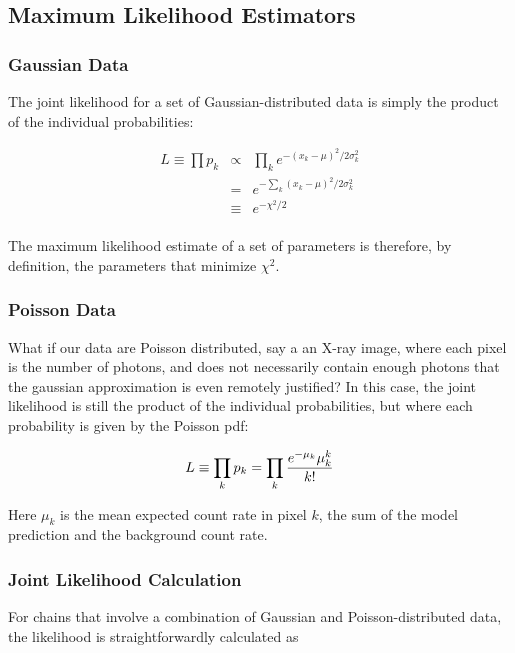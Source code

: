 \subsection{Maximum Likelihood Estimators}
\label{sec:maxmean}

\subsubsection{Gaussian Data}

The joint likelihood for a set of Gaussian-distributed data is simply
the product of the individual probabilities:

\begin{eqnarray}
L \equiv \prod{p_k} &\propto& \prod_k{e^{-(x_k - \mu)^2/2\sigma^2_k}} \\
                    &=& e^{-\sum_k{(x_k - \mu)^2/2\sigma^2_k}} \\
                    &\equiv& e^{-\chi^2/2} \\
\end{eqnarray}

The maximum likelihood estimate of a set of parameters is therefore,
by definition, the parameters that minimize $\chi^2$.

\subsubsection{Poisson Data}

What if our data are Poisson distributed, say a an X-ray image, where
each pixel is the number of photons, and does not necessarily contain
enough photons that the gaussian approximation is even remotely
justified?  In this case, the joint likelihood is still the product of
the individual probabilities, but where each probability is given by
the Poisson pdf:

\begin{equation}
L \equiv \prod_k{p_k} = \prod_k{{{e^{-\mu_k}\mu_k^k}\over{k!}}}
\end{equation}

Here $\mu_k$ is the mean expected count rate in pixel $k$, the sum of
the model prediction and the background count rate.

\subsubsection{Joint Likelihood Calculation}

For chains that involve a combination of Gaussian and
Poisson-distributed data, the likelihood is straightforwardly calculated as


